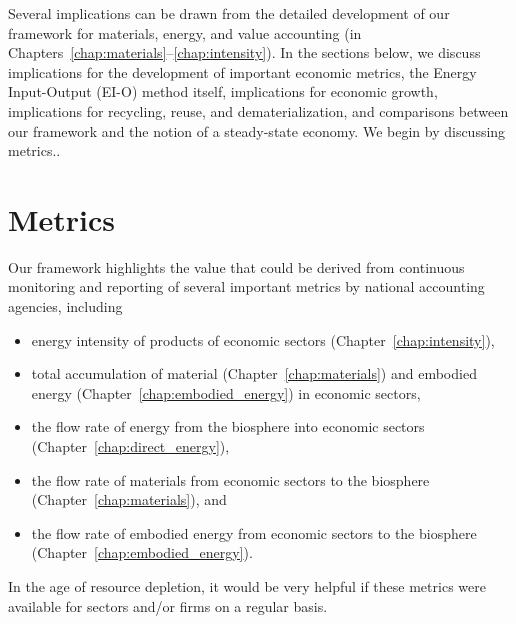 
Several implications can be drawn from the detailed development 
of our framework for materials, energy, and value accounting 
(in Chapters~\ref{chap:materials}--\ref{chap:intensity}).
In the sections below, we discuss 
implications for the development of important economic metrics,
the Energy Input-Output (EI-O) method itself,
implications for economic growth,
implications for recycling, reuse, and dematerialization, and
comparisons between our framework and the notion of a steady-state economy.
We begin by discussing metrics..


\section{Metrics}
\label{sec:Metrics}

Our framework highlights the value that could be derived
from continuous monitoring and reporting of several important metrics
by national accounting agencies, including
%
\begin{itemize}
	\item{energy intensity of products of economic sectors 
	(Chapter~\ref{chap:intensity}),}
	\item{total accumulation of material (Chapter~\ref{chap:materials}) 
	and embodied energy (Chapter~\ref{chap:embodied_energy}) in economic sectors,}
	\item{the flow rate of energy from the biosphere into economic sectors 
	(Chapter~\ref{chap:direct_energy}),}
	\item{the flow rate of materials from economic sectors to the biosphere 
	(Chapter~\ref{chap:materials}), and}
	\item{the flow rate of embodied energy from economic sectors to the biosphere 
	(Chapter~\ref{chap:embodied_energy}).}
\end{itemize}
%
In the age of resource depletion, 
it would be very helpful if these metrics were available for sectors and/or firms 
on a regular basis.  


